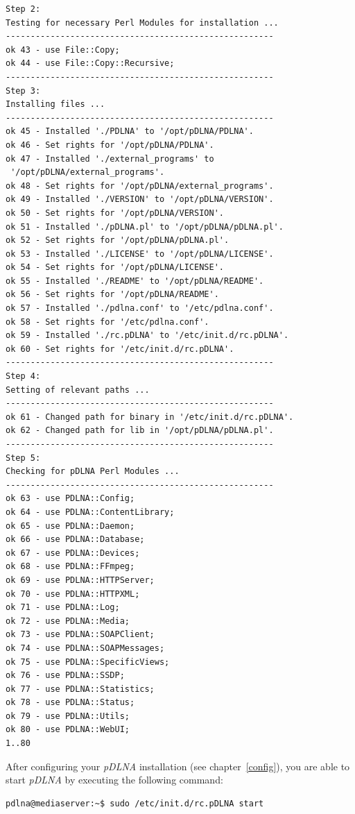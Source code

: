 \documentclass[a4paper,oneside,10pt]{report}
\newenvironment{colframecmd}{%
  \begin{Sbox}
    \begin{minipage}{.99\columnwidth}
}{%
  \end{minipage}
  \end{Sbox}
  \begin{center}
    \fcolorbox{black}{LightSteelBlue}{\TheSbox}
  \end{center}
}
\begin{document}
\begin{colframecmd}
\begin{verbatim}
Step 2:
Testing for necessary Perl Modules for installation ...
------------------------------------------------------
ok 43 - use File::Copy;
ok 44 - use File::Copy::Recursive;
------------------------------------------------------
Step 3:
Installing files ...
------------------------------------------------------
ok 45 - Installed './PDLNA' to '/opt/pDLNA/PDLNA'.
ok 46 - Set rights for '/opt/pDLNA/PDLNA'.
ok 47 - Installed './external_programs' to
 '/opt/pDLNA/external_programs'.
ok 48 - Set rights for '/opt/pDLNA/external_programs'.
ok 49 - Installed './VERSION' to '/opt/pDLNA/VERSION'.
ok 50 - Set rights for '/opt/pDLNA/VERSION'.
ok 51 - Installed './pDLNA.pl' to '/opt/pDLNA/pDLNA.pl'.
ok 52 - Set rights for '/opt/pDLNA/pDLNA.pl'.
ok 53 - Installed './LICENSE' to '/opt/pDLNA/LICENSE'.
ok 54 - Set rights for '/opt/pDLNA/LICENSE'.
ok 55 - Installed './README' to '/opt/pDLNA/README'.
ok 56 - Set rights for '/opt/pDLNA/README'.
ok 57 - Installed './pdlna.conf' to '/etc/pdlna.conf'.
ok 58 - Set rights for '/etc/pdlna.conf'.
ok 59 - Installed './rc.pDLNA' to '/etc/init.d/rc.pDLNA'.
ok 60 - Set rights for '/etc/init.d/rc.pDLNA'.
------------------------------------------------------
Step 4:
Setting of relevant paths ...
------------------------------------------------------
ok 61 - Changed path for binary in '/etc/init.d/rc.pDLNA'.
ok 62 - Changed path for lib in '/opt/pDLNA/pDLNA.pl'.
------------------------------------------------------
Step 5:
Checking for pDLNA Perl Modules ...
------------------------------------------------------
ok 63 - use PDLNA::Config;
ok 64 - use PDLNA::ContentLibrary;
ok 65 - use PDLNA::Daemon;
ok 66 - use PDLNA::Database;
ok 67 - use PDLNA::Devices;
ok 68 - use PDLNA::FFmpeg;
ok 69 - use PDLNA::HTTPServer;
ok 70 - use PDLNA::HTTPXML;
ok 71 - use PDLNA::Log;
ok 72 - use PDLNA::Media;
ok 73 - use PDLNA::SOAPClient;
ok 74 - use PDLNA::SOAPMessages;
ok 75 - use PDLNA::SpecificViews;
ok 76 - use PDLNA::SSDP;
ok 77 - use PDLNA::Statistics;
ok 78 - use PDLNA::Status;
ok 79 - use PDLNA::Utils;
ok 80 - use PDLNA::WebUI;
1..80
\end{verbatim}
\end{colframecmd}

After configuring your {\em pDLNA} installation (see chapter~\ref{config}), you are able to start {\em pDLNA} by executing the following command:
\begin{colframecmd}
\begin{verbatim}
pdlna@mediaserver:~$ sudo /etc/init.d/rc.pDLNA start
\end{verbatim}
\end{colframecmd}
\end{document}
